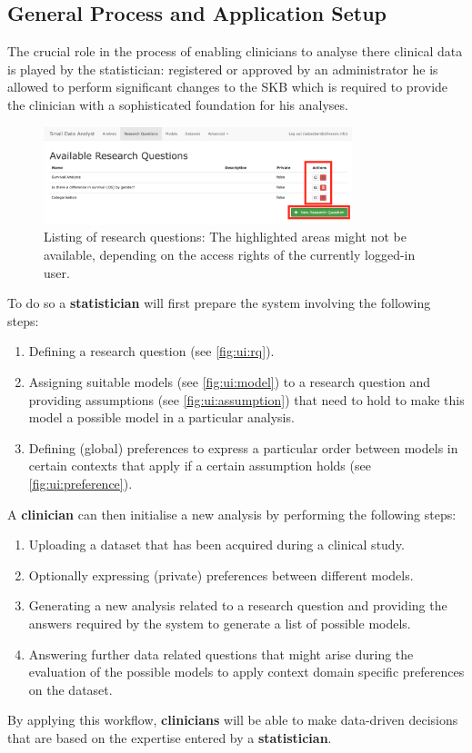 \subsection{General Process and Application Setup}
\label{sub:process}
The crucial role in the process of enabling clinicians to analyse there clinical data is played by the statistician: registered or approved by an administrator he is allowed to perform significant changes to the \gls{SKB} which is required to provide the clinician with a sophisticated foundation for his analyses. 

\begin{figure}[h]
\centering
\includegraphics[width=0.8\textwidth]{figures/ui_RQ}
\caption{Listing of research questions: The highlighted areas might not be available, depending on the access rights of the currently logged-in user.}
\label{fig:ui:rq}
\end{figure}

To do so a \textbf{statistician} will first prepare the system involving the following steps:

\begin{enumerate}
	\item Defining a research question (see \autoref{fig:ui:rq}).
	\item Assigning suitable models (see \autoref{fig:ui:model}) to a research question and providing assumptions (see \autoref{fig:ui:assumption}) that need to hold to make this model a possible model in a particular analysis.
	\item Defining (global) preferences to express a particular order between models in certain contexts that apply if a certain assumption holds (see \autoref{fig:ui:preference}).
\end{enumerate}

\bigskip

A \textbf{clinician} can then initialise a new analysis by performing the following steps:
 
\begin{enumerate}
	\item Uploading a dataset that has been acquired during a clinical study.
	\item Optionally expressing (private) preferences between different models.
	\item Generating a new analysis related to a research question and providing the answers required by the system to generate a list of possible models.
	\item Answering further data related questions that might arise during the evaluation of the possible models to apply context domain specific preferences on the dataset.
\end{enumerate}
\bigskip

By applying this workflow, \textbf{clinicians} will be able to make data-driven decisions that are based on the expertise entered by a \textbf{statistician}.
